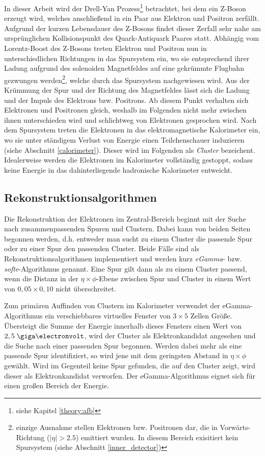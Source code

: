 In dieser Arbeit wird der Drell-Yan Prozess\footnote{siehe Kapitel
\ref{theory:afb}} betrachtet, bei dem ein Z-Boson erzeugt wird, welches
anschließend in ein Paar aus Elektron und Positron zerfällt. Aufgrund der
kurzen Lebensdauer des Z-Bosons findet dieser Zerfall sehr nahe am
ursprünglichen Kollisionspunkt des Quark-Antiquark Paares statt. Abhängig vom
Lorentz-Boost des Z-Bosons treten Elektron und Positron nun in
unterschiedlichen Richtungen in das Spursystem ein, wo sie entsprechend ihrer
Ladung aufgrund des solenoiden Magnetfeldes auf eine gekrümmte Flugbahn
gezwungen werden\footnote{einzige Ausnahme stellen Elektronen bzw. Positronen
dar, die in Vorwärts-Richtung ($|\eta|>2.5$) emittiert wurden. In diesem
Bereich exisitiert kein Spursystem (siehe Abschnitt \ref{inner_detector})},
welche durch das Spursystem nachgewiesen wird. Aus der Krümmung der Spur und
der Richtung des Magnetfeldes lässt sich die Ladung und der Impuls des
Elektrons bzw. Positrons. Ab diesem Punkt verhalten sich Elektronen und
Positronen gleich, weshalb im Folgenden nicht mehr zwischen ihnen unterschieden
wird und schlichtweg von Elektronen gesprochen wird. Nach dem Spursystem treten
die Elektronen in das elektromagnetische Kalorimeter ein, wo sie unter
ständigem Verlust von Energie einen Teilchenschauer induzieren (siehe Abschnitt
\ref{calorimeter}). Dieser wird im Folgenden als \textit{Cluster} bezeichent.
Idealerweise werden die Elektronen im Kalorimeter vollständig gestoppt, sodass
keine Energie in das dahinterliegende hadronische Kalorimeter entweicht.



\subsection{Rekonstruktionsalgorithmen}
\label{reconstruction}
Die Rekonstruktion der Elektronen im Zentral-Bereich beginnt mit der Suche nach
zusammenpassenden Spuren und Clustern. Dabei kann von beiden Seiten begonnen
werden, d.h. entweder man sucht zu einem Cluster die passende Spur oder zu
einer Spur den passenden Cluster. Beide Fälle sind als
Rekonstruktionsalgorithmen implementiert und werden kurz \textit{eGamma}- bzw.
\textit{softe}-Algorithmus genannt. Eine Spur gilt dann als zu einem Cluster
passend, wenn die Distanz in der $\eta\times\phi$-Ebene zwischen Spur und
Cluster in einem Wert von $0,05\times0,10$ nicht überschreitet.

Zum primären Auffinden von Clustern im Kalorimeter verwendet der
eGamma-Algorithmus ein verschiebbares virtuelles Fenster von $3\times5$ Zellen
Größe. Übersteigt die Summe der Energie innerhalb dieses Fensters einen Wert
von $2,5\GeV$, wird der Cluster als Elektronkandidat angesehen und die Suche
nach einer passenden Spur begonnen. Werden dabei mehr als eine passende Spur
identifiziert, so wird jene mit dem geringsten Abstand in $\eta\times\phi$
gewählt. Wird im Gegenteil keine Spur gefunden, die auf den Cluster zeigt, wird
dieser als Elektronkandidat verworfen. Der eGamma-Algorithmus eignet sich für
einen großen Bereich der Energie.

